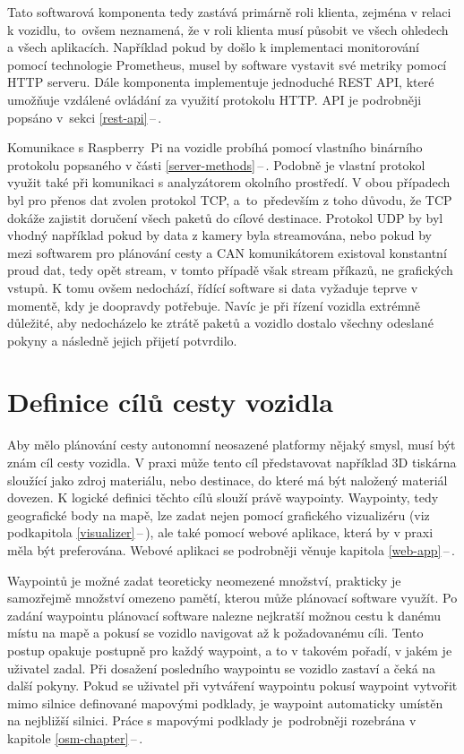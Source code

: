 \documentclass[czech, bachelor]{diploma}
\newcommand{\filipref}[1]{\ref{#1}\,--\,\nameref{#1}}
\begin{document}
Tato softwarová komponenta tedy zastává primárně roli klienta, zejména v relaci k vozidlu, to~ovšem neznamená, že v roli klienta
musí působit ve všech ohledech a všech aplikacích. Například pokud by došlo k implementaci monitorování pomocí technologie
Prometheus, musel by software vystavit své metriky pomocí HTTP serveru. Dále komponenta implementuje jednoduché REST API, které
umožňuje vzdálené ovládání za využití protokolu HTTP. API je podrobněji popsáno v~sekci \filipref{rest-api}.

Komunikace s Raspberry~Pi na vozidle probíhá pomocí vlastního binárního protokolu popsaného v části \filipref{server-methods}.
Podobně je vlastní protokol využit také při komunikaci s analyzátorem okolního prostředí. V obou případech byl pro přenos dat
zvolen protokol TCP, a~to~především z toho důvodu, že TCP dokáže zajistit doručení všech paketů do cílové destinace. Protokol UDP
by byl vhodný například pokud by data z kamery byla streamována, nebo pokud by mezi softwarem pro plánování cesty a CAN
komunikátorem existoval konstantní proud dat, tedy opět stream, v tomto případě však stream příkazů, ne grafických vstupů. K tomu
ovšem nedochází, řídící software si data vyžaduje teprve v momentě, kdy je doopravdy potřebuje. Navíc je při řízení vozidla
extrémně důležité, aby nedocházelo ke ztrátě paketů a vozidlo dostalo všechny odeslané pokyny a následně jejich přijetí potvrdilo.

\section{Definice cílů cesty vozidla} \label{target-definition}

Aby mělo plánování cesty autonomní neosazené platformy nějaký smysl, musí být znám cíl cesty vozidla. V praxi může tento cíl
představovat například 3D tiskárna sloužící jako zdroj materiálu, nebo destinace, do které má být naložený materiál dovezen.
K logické definici těchto cílů slouží právě waypointy. Waypointy, tedy geografické body na mapě, lze zadat nejen pomocí grafického
vizualizéru (viz podkapitola \filipref{visualizer}), ale také pomocí webové aplikace, která by v praxi měla být preferována.
Webové aplikaci se podrobněji věnuje kapitola \filipref{web-app}.

Waypointů je možné zadat teoreticky neomezené množství, prakticky je samozřejmě množství omezeno pamětí, kterou může plánovací
software využít. Po zadání waypointu plánovací software nalezne nejkratší možnou cestu k danému místu na mapě a pokusí se vozidlo
navigovat až k požadovanému cíli. Tento postup opakuje postupně pro každý waypoint, a to v takovém pořadí, v jakém je uživatel
zadal. Při dosažení posledního waypointu se vozidlo zastaví a čeká na další pokyny. Pokud se uživatel při vytváření waypointu
pokusí waypoint vytvořit mimo silnice definované mapovými podklady, je waypoint automaticky umístěn na nejbližší silnici.
Práce s mapovými podklady je~podrobněji rozebrána v kapitole \filipref{osm-chapter}.
\end{document}
